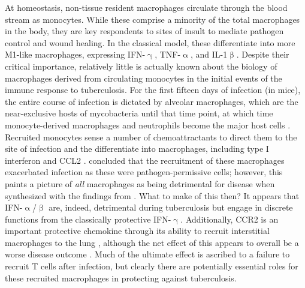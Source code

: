 At homeostasis, non\hyp{}tissue resident macrophages circulate through the blood stream as monocytes. While these comprise a minority of the total macrophages in the body, they are key respondents to sites of insult to mediate pathogen control and wound healing. In the classical model, these differentiate into more M1\hyp{}like macrophages, expressing IFN\hyp{}$\upgamma$, TNF\hyp{}$\upalpha$, and IL\hyp{}1$\upbeta$. Despite their critical importance, relatively little is actually known about the biology of macrophages derived from circulating monocytes in the initial events of the immune response to tuberculosis. For the first fifteen days of infection (in mice), the entire course of infection is dictated by alveolar macrophages, which are the near\hyp{}exclusive hosts of mycobacteria until that time point, at which time monocyte\hyp{}derived macrophages and neutrophils become the major host cells \citep{Cohen2018}. Recruited monocytes sense a number of chemoattractants to direct them to the site of infection and the differentiate into macrophages, including type I interferon and CCL2 \citep{Antonelli2010, Desvignes2012, Peters2001, Peters2004}. \citet{Antonelli2010} concluded that the recruitment of these macrophages exacerbated infection as these were pathogen\hyp{}permissive cells; however, this paints a picture of \textit{all} macrophages as being detrimental for disease when synthesized with the findings from \citet{Leemans2001}. What to make of this then? It appears that IFN\hyp{}$\upalpha$/$\upbeta$ are, indeed, detrimental during tuberculosis but engage in discrete functions from the classically protective IFN\hyp{}$\upgamma$. Additionally, CCR2 is an important protective chemokine through its ability to recruit interstitial macrophages to the lung \citep{Peters2001}, although the net effect of this appears to overall be a worse disease outcome \citep{Cambier2014b}. Much of the ultimate effect is ascribed to a failure to recruit T cells after infection, but clearly there are potentially essential roles for these recruited macrophages in protecting against tuberculosis. 

